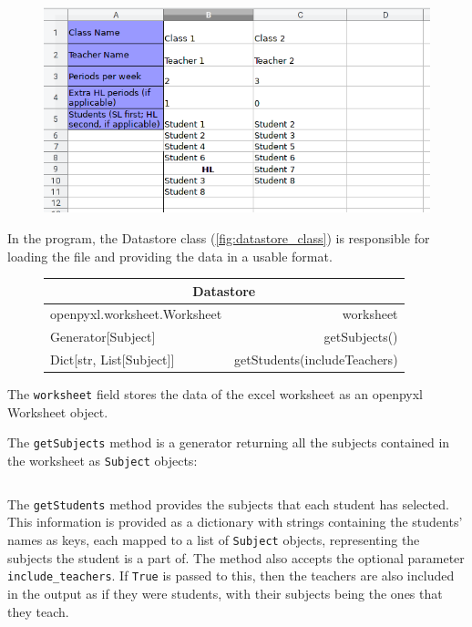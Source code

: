 \documentclass[12pt]{article}
\newcommand{\code}[1]{\texttt{\color{Grey}#1}}
\begin{document}
\begin{figure}[H]
    \caption{}
    \includegraphics[width=\textwidth]{data_file_structure.png}
    \label{fig:data_file_structure}
\end{figure}

In the program, the Datastore class (\autoref{fig:datastore_class}) is responsible for loading
the file and providing the data in a usable format.
%
\begin{figure}[H]
    \caption{}
    \label{fig:datastore_class}
    \centering
    \def\arraystretch{1.5}
    \begin{tabular}{|l r|}
        \hline
        \multicolumn{2}{|c|}{Datastore}\\
        \hline
        \hline
        openpyxl.worksheet.Worksheet &worksheet\\
        \hline
        Generator[Subject] &getSubjects()\\
        Dict[str, List[Subject]] &getStudents(includeTeachers)\\
        \hline
    \end{tabular}
    \label{table:datastore}
\end{figure}
%
The \code{worksheet} field stores the data of the excel worksheet as an openpyxl Worksheet
object. 

The \code{getSubjects} method is a generator returning all the subjects contained in the
worksheet as \code{Subject} objects:
\vspace{-3mm}
\begin{figure}[H]
    \caption{}
    \inputminted{python}{../media/datastore_get_subjects.py}
    \label{fig:get_subjects}
\end{figure}

The \code{getStudents} method provides the subjects that each student has selected. This
information is provided as a dictionary with strings containing the students' names as keys,
each mapped to a list of \code{Subject} objects, representing the subjects the student is a
part of. The method also accepts the optional parameter \code{include\_teachers}. If
\code{True} is passed to this, then the teachers are also included in the output as if they
were students, with their subjects being the ones that they teach.
\vspace{-3mm}
\begin{figure}[H]
    \caption{}
    \inputminted{python}{../media/datastore_get_students.py}
    \label{fig:get_students}
\end{figure}
\end{document}
